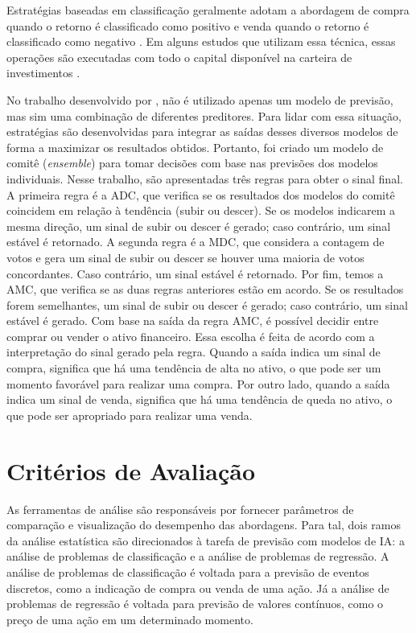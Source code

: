 Estratégias baseadas em classificação geralmente adotam a abordagem de compra quando o retorno é classificado como positivo e venda quando o retorno é classificado como negativo \cite{Chaojie_Stock}. Em alguns estudos que utilizam essa técnica, essas operações são executadas com todo o capital disponível na carteira de investimentos \cite{Jerzy_Deep, Charlene, C_Veeramani_Exploration}.

No trabalho desenvolvido por , não é utilizado apenas um modelo de previsão, mas sim uma combinação de diferentes preditores. Para lidar com essa situação, estratégias são desenvolvidas para integrar as saídas desses diversos modelos de forma a maximizar os resultados obtidos. Portanto, foi criado um modelo de comitê (\textit{ensemble}) para tomar decisões com base nas previsões dos modelos individuais. Nesse trabalho, são apresentadas três regras para obter o sinal final. A primeira regra é a \ac{ADC}, que verifica se os resultados dos modelos do comitê coincidem em relação à tendência (subir ou descer). Se os modelos indicarem a mesma direção, um sinal de subir ou descer é gerado; caso contrário, um sinal estável é retornado. A segunda regra é a \ac{MDC}, que considera a contagem de votos e gera um sinal de subir ou descer se houver uma maioria de votos concordantes. Caso contrário, um sinal estável é retornado. Por fim, temos a \ac{AMC}, que verifica se as duas regras anteriores estão em acordo. Se os resultados forem semelhantes, um sinal de subir ou descer é gerado; caso contrário, um sinal estável é gerado. Com base na saída da regra \ac{AMC}, é possível decidir entre comprar ou vender o ativo financeiro. Essa escolha é feita de acordo com a interpretação do sinal gerado pela regra. Quando a saída indica um sinal de compra, significa que há uma tendência de alta no ativo, o que pode ser um momento favorável para realizar uma compra. Por outro lado, quando a saída indica um sinal de venda, significa que há uma tendência de queda no ativo, o que pode ser apropriado para realizar uma venda.


\section{Critérios de Avaliação}
\label{subsec:criterio_avaliacao}
As ferramentas de análise são responsáveis por fornecer parâmetros de comparação e visualização do desempenho das abordagens. Para tal, dois ramos da análise estatística são direcionados à tarefa de previsão com modelos de \ac{IA}: a análise de problemas de classificação e a análise de problemas de regressão. A análise de problemas de classificação é voltada para a previsão de eventos discretos, como a indicação de compra ou venda de uma ação. Já a análise de problemas de regressão é voltada para previsão de valores contínuos, como o preço de uma ação em um determinado momento.

